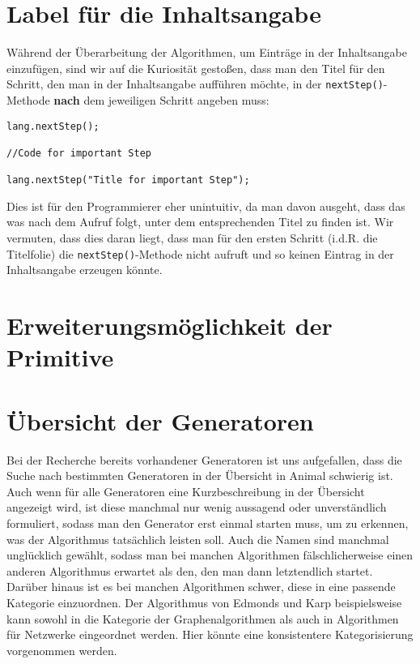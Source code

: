 \documentclass[solution]{report}
\begin{document}
		\section{Label für die Inhaltsangabe}
			Während der Überarbeitung der Algorithmen, um Einträge in der Inhaltsangabe einzufügen, sind wir auf die Kuriosität gestoßen, dass man den Titel für den Schritt, den man in der Inhaltsangabe aufführen möchte, in der \lstinline!nextStep()!-Methode \textbf{nach} dem jeweiligen Schritt angeben muss:
			\begin{lstlisting}[frame=single, caption = Code-Beispiel für die Angabe des Titels nach dem Code]
lang.nextStep();

//Code for important Step

lang.nextStep("Title for important Step");
			\end{lstlisting}
			Dies ist für den Programmierer eher unintuitiv, da man davon ausgeht, dass das was nach dem Aufruf folgt, unter dem entsprechenden Titel zu finden ist. Wir vermuten, dass dies daran liegt, dass man für den ersten Schritt (i.d.R. die Titelfolie) die \lstinline!nextStep()!-Methode nicht aufruft und so keinen Eintrag in der Inhaltsangabe erzeugen könnte.
		
		\section{Erweiterungsmöglichkeit der Primitive}
		
		\section{Übersicht der Generatoren}
			Bei der Recherche bereits vorhandener Generatoren ist uns aufgefallen, dass die Suche nach bestimmten Generatoren in der Übersicht in Animal schwierig ist. Auch wenn für alle Generatoren eine Kurzbeschreibung in der Übersicht angezeigt wird, ist diese manchmal nur wenig aussagend oder unverständlich formuliert, sodass man den Generator erst einmal starten muss, um zu erkennen, was der Algorithmus tatsächlich leisten soll. Auch die Namen sind manchmal unglücklich gewählt, sodass man bei manchen Algorithmen fälschlicherweise einen anderen Algorithmus erwartet als den, den man dann letztendlich startet.\\
			Darüber hinaus ist es bei manchen Algorithmen schwer, diese in eine passende Kategorie einzuordnen. Der Algorithmus von Edmonds und Karp beispielsweise kann sowohl in die Kategorie der Graphenalgorithmen als auch in Algorithmen für Netzwerke eingeordnet werden. Hier könnte eine konsistentere Kategorisierung vorgenommen werden.
\end{document}
